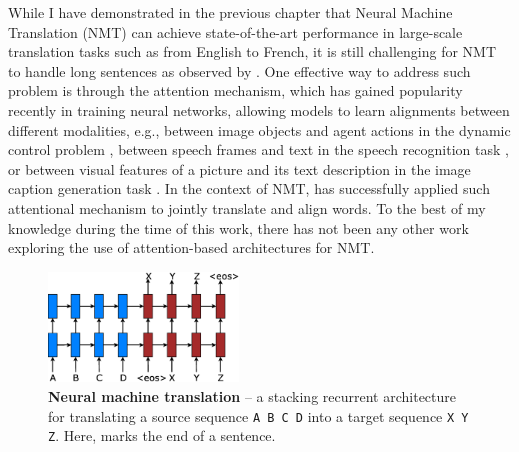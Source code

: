
While I have demonstrated in the previous chapter that Neural Machine Translation (NMT) can achieve state-of-the-art performance in
large-scale translation tasks such as from English to French, it is still challenging for NMT to handle long sentences as observed by .
One effective way to address such problem is through the attention mechanism, which has gained popularity recently in
training neural networks, allowing models to learn alignments between different
modalities, e.g., between image objects and agent actions in the dynamic control
problem \cite{mnih14}, between speech frames and text in the speech recognition
task \cite{jan14},  or between visual features of a picture and its text
description in the image caption generation task \cite{xu15}. In the context of
NMT,  has successfully applied such attentional mechanism to
jointly translate and align words. To the best of my knowledge during the time of this work, there has not
been any other work exploring the use of attention-based architectures for NMT.

\begin{figure}
\centering
\includegraphics[width=0.45\textwidth, clip=true, trim= 0 0 0 0]{img/4-lstm} %
\caption[Neural machine translation]{{\bf Neural machine translation} -- a stacking recurrent architecture for translating a source sequence \texttt{A B C D} into a target sequence \texttt{X Y Z}. Here, \eos{} marks the end of a sentence.
} 
\label{f:lstm}
\end{figure}

